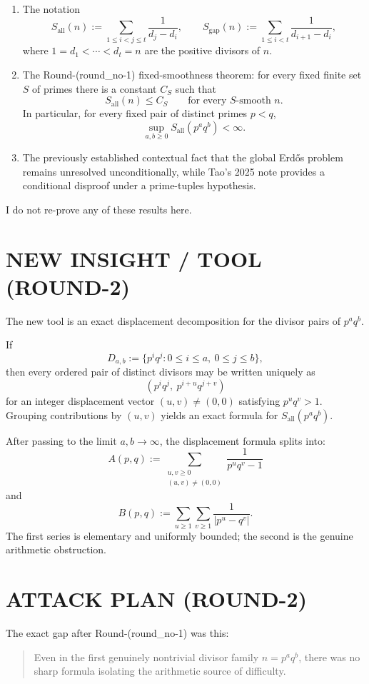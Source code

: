 \begin{enumerate}
\item The notation
\[
S_{\mathrm{all}}(n):=\sum_{1\le i<j\le t}\frac{1}{d_j-d_i},
\qquad
S_{\mathrm{gap}}(n):=\sum_{1\le i<t}\frac{1}{d_{i+1}-d_i},
\]
where \(1=d_1<\cdots<d_t=n\) are the positive divisors of \(n\).
\item The Round-(round\_no-1) fixed-smoothness theorem: for every fixed finite set \(S\) of primes there is a constant \(C_S\) such that
\[
S_{\mathrm{all}}(n)\le C_S
\qquad\text{for every }S\text{-smooth }n.
\]
In particular, for every fixed pair of distinct primes \(p<q\),
\[
\sup_{a,b\ge 0} S_{\mathrm{all}}(p^a q^b)<\infty.
\]
\item The previously established contextual fact that the global Erd\H{o}s problem remains unresolved unconditionally, while Tao's 2025 note provides a conditional disproof under a prime-tuples hypothesis.
\end{enumerate}

I do not re-prove any of these results here.

\section{NEW INSIGHT / TOOL (ROUND-2)}

The new tool is an exact displacement decomposition for the divisor pairs of \(p^a q^b\).

If
\[
D_{a,b}:=\{p^i q^j:0\le i\le a,\ 0\le j\le b\},
\]
then every ordered pair of distinct divisors may be written uniquely as
\[
(p^i q^j,\ p^{i+u}q^{j+v})
\]
for an integer displacement vector \((u,v)\neq(0,0)\) satisfying \(p^u q^v>1\). Grouping contributions by \((u,v)\) yields an exact formula for \(S_{\mathrm{all}}(p^a q^b)\).

After passing to the limit \(a,b\to\infty\), the displacement formula splits into:
\[
A(p,q):=\sum_{\substack{u,v\ge 0\\(u,v)\neq(0,0)}}\frac{1}{p^u q^v-1}
\]
and
\[
B(p,q):=\sum_{u\ge 1}\sum_{v\ge 1}\frac{1}{|p^u-q^v|}.
\]
The first series is elementary and uniformly bounded; the second is the genuine arithmetic obstruction.

\section{ATTACK PLAN (ROUND-2)}

The exact gap after Round-(round\_no-1) was this:

\begin{quote}
Even in the first genuinely nontrivial divisor family \(n=p^a q^b\), there was no sharp formula isolating the arithmetic source of difficulty.
\end{quote}

